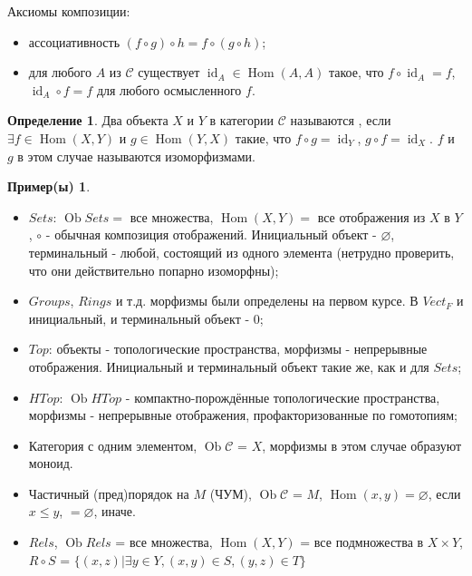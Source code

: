 \documentclass[a4paper]{article}
\theoremstyle{indented}
\theoremstyle{definition}
\newtheorem{defn}{Определение}
\newtheorem{exl}{Пример(ы)}
\theoremstyle{remark}
\DeclareMathOperator{\id}{id}
\DeclareMathOperator{\Hom}{Hom}
\DeclareMathOperator{\Ob}{Ob}
\begin{document}
Аксиомы композиции: 

\begin{itemize}
    \item ассоциативность $(f\circ g)\circ h = f\circ (g\circ h)$;
    \item для любого $A$ из $\mathcal{C}$ существует $\id_{A}\in{\Hom (A, A)}$ такое, что $f\circ \id_{A} = f$, $\id_{A}\circ f = f$ для любого осмысленного $f$.
\end{itemize}

\begin{defn}
    Два объекта $X$ и $Y$ в категории $\mathcal{C}$ называются , если $\exists f\in{\Hom (X, Y)}$ и $g\in{\Hom (Y, X)}$ такие, что $f\circ g=\id_{Y}$, $g\circ f=\id_{X}$. $f$ и $g$ в этом случае называются $\textit{изоморфизмами}$.
\end{defn}

\begin{exl} \
    \begin{itemize}
        \item $Sets$: $\Ob Sets=$ все множества, $\Hom (X, Y)=$ все отображения из $X$ в $Y$, $\circ $ - обычная композиция отображений. Инициальный объект - $\varnothing$, терминальный - любой, состоящий из одного элемента (нетрудно проверить, что они действительно попарно изоморфны);
        \item $Groups$, $Rings$ и т.д. морфизмы были определены на первом курсе. В $Vect_{F}$ и инициальный, и терминальный объект - 0;
        \item $Top$: объекты - топологические пространства, морфизмы - непрерывные отображения. Инициальный и терминальный объект такие же, как и для $Sets$;
        \item $HTop$: $\Ob HTop$ - компактно-порождённые топологические пространства, морфизмы - непрерывные отображения, профакторизованные по гомотопиям;
        \item Категория с одним элементом, $\Ob\mathcal{C}$ = ${X}$, морфизмы в этом случае образуют моноид.
        \item Частичный (пред)порядок на $M$ (ЧУМ), $\Ob\mathcal{C}$ = $M$, $\Hom (x, y) = {\varnothing}$, если $x\leq y$, $=\varnothing$, иначе.
        \item $Rels$, $\Ob Rels$ = все множества, $\Hom (X, Y)$ = все подмножества в $X\times{Y}$, $R\circ  S$ = $\lbrace(x, z) \vert \exists y \in Y, (x, y)\in S, (y, z)\in T\rbrace$
    \end{itemize}
\end{exl}
\end{document}
